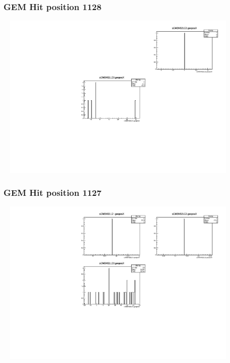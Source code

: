 \documentclass[slidestop,compress,mathserif]{beamer}
\begin{document}
\begin{frame}\frametitle{GEM Hit position 1128}
	 \includegraphics[width=12cm,height=8cm]{GEM_Hit_position_1128.pdf}
\end{frame}
\begin{frame}\frametitle{GEM Hit position 1127}
	 \includegraphics[width=12cm,height=8cm]{GEM_Hit_position_1127.pdf}
\end{frame}
\end{document}
